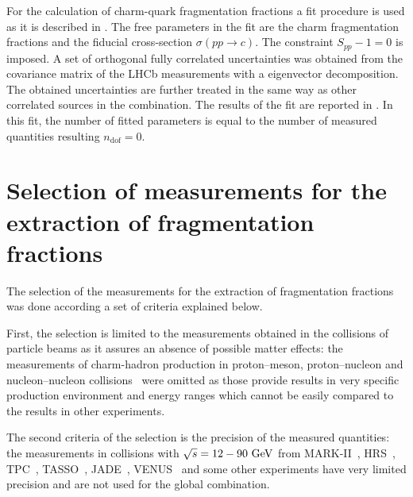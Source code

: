 For the calculation of charm-quark fragmentation fractions a fit 
procedure is used as it is described in . The free 
parameters in the fit are the charm fragmentation fractions and the 
fiducial cross-section $\sigma(pp\rightarrow c)$.
%
The constraint $S_{pp}-1=0$ is imposed.
%
A set of orthogonal fully correlated uncertainties was obtained from the 
 covariance matrix of the LHCb measurements with a eigenvector 
 decomposition. The obtained uncertainties  are further treated in the 
 same way as other correlated sources in the combination.
%
The results of the fit are reported in .
In this fit, the number of fitted parameters is equal to the number 
of measured quantities resulting  $n_{\text{dof}}=0$.
\FloatBarrier
\tabLHCBaverage
\FloatBarrier
\section{Selection of measurements for the extraction of fragmentation 
fractions}

The selection of the measurements for the extraction of fragmentation 
fractions was done according a set of criteria explained below.

First, the selection is limited to the measurements obtained in the 
collisions of particle beams as it assures an absence of possible matter 
effects: the measurements of charm-hadron production in 
proton--meson, proton--nucleon and nucleon--nucleon 
collisions~\cite{Alves:1996rz,Barlag:1990bv,
Barlag:1990hg,Abt:2007zg,Tlusty:2012ix,Ye:2014eia} were omitted as 
those provide results in very specific production environment and energy 
ranges  which cannot be easily compared to the results in other 
experiments.

The second criteria of the selection is the  precision of the measured 
quantities:
 the measurements in \epem collisions with $\sqrt{s}=12-90~{\text{Ge}\kern-0.06667em\text{V\/}}$
 from 
 MARK-II~\cite{Yelton:1982ix}, HRS~\cite{Ahlen:1983gz,Derrick:1984ba,
 Derrick:1985ip,Low:1986nz,Baringer:1988ue}, TPC~\cite{Aihara:1985pp},
TASSO~\cite{Althoff:1983rt,Braunschweig:1989kq}, JADE~\cite{
Bartel:1984ud,Bartel:1985be}, VENUS~\cite{Hinode:1993gj} and some other 
experiments  have very limited precision and are not used for the 
global 
combination. 


